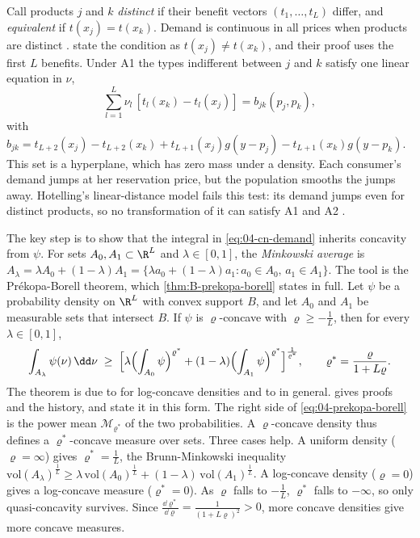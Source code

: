 Call products $j$ and $k$ \emph{distinct} if their benefit vectors $(t_1, \dots, t_L)$ differ, and
\emph{equivalent} if $t(x_j) = t(x_k)$. Demand is continuous in all prices when products are distinct
\citep[Proposition 1]{CaplinNalebuff1991}.
\citeauthor{CaplinNalebuff1991} state the condition as $t(x_j) \neq t(x_k)$, and their proof uses the first $L$
benefits. Under A1 the types indifferent between $j$ and $k$ satisfy one linear equation in $\nu$,
\[
  \sum_{l=1}^L \nu_l\,[t_l(x_k) - t_l(x_j)] = b_{jk}(p_j, p_k),
\]
with $b_{jk} = t_{L+2}(x_j) - t_{L+2}(x_k) + t_{L+1}(x_j)g(y - p_j) - t_{L+1}(x_k)g(y - p_k)$. This set is a
hyperplane, which has zero mass under a density. Each consumer's demand jumps at her reservation price, but the
population smooths the jumps away. Hotelling's linear-distance model fails this test: its demand jumps even for
distinct products, so no transformation of it can satisfy A1 and A2 \citep[p.~9]{CaplinNalebuff1991}.

The key step is to show that the integral in \eqref{eq:04-cn-demand} inherits concavity from $\psi$. For sets
$A_0, A_1 \subset \R^L$ and $\lambda \in [0,1]$, the \emph{Minkowski average} is
$A_\lambda = \lambda A_0 + (1 - \lambda)A_1 = \{\lambda a_0 + (1 - \lambda)a_1 : a_0 \in A_0,\, a_1 \in A_1\}$.
The tool is the Pr\'ekopa-Borell theorem, which \cref{thm:B-prekopa-borell} states in full. Let $\psi$ be a
probability density on $\R^L$ with convex support $B$, and let $A_0$ and $A_1$ be measurable sets that intersect
$B$. If $\psi$ is $\varrho$-concave with $\varrho \ge -\frac{1}{L}$, then for every $\lambda \in [0,1]$,
\begin{equation}\label{eq:04-prekopa-borell}
  \int_{A_\lambda}\psi(\nu)\,\dd\nu \;\ge\;
  \Bigl[\lambda\Bigl(\int_{A_0}\psi\Bigr)^{\varrho^*} + (1 - \lambda)\Bigl(\int_{A_1}\psi\Bigr)^{\varrho^*}\Bigr]^{\frac{1}{\varrho^*}},
  \qquad \varrho^* = \frac{\varrho}{1 + L\varrho}.
\end{equation}
The theorem is due to \citet{Prekopa1971} for log-concave densities and to \citet{Borell1975} in general.
\citet{DasGupta1980} gives proofs and the history, and \citet[p.~11]{CaplinNalebuff1991} state it in this form.
The right side of \eqref{eq:04-prekopa-borell} is the power mean $\mathcal{M}_{\varrho^*}$ of the two
probabilities. A $\varrho$-concave density thus defines a $\varrho^*$-concave measure over sets. Three cases help.
A uniform density ($\varrho = \infty$) gives $\varrho^* = \frac{1}{L}$, the Brunn-Minkowski inequality
$\mathrm{vol}(A_\lambda)^{\frac{1}{L}} \ge \lambda\,\mathrm{vol}(A_0)^{\frac{1}{L}} + (1 - \lambda)\,\mathrm{vol}(A_1)^{\frac{1}{L}}$.
A log-concave density ($\varrho = 0$) gives a log-concave measure ($\varrho^* = 0$). As $\varrho$ falls to $-\frac{1}{L}$, $\varrho^*$
falls to $-\infty$, so only quasi-concavity survives. Since $\frac{\dd \varrho^*}{\dd \varrho} = \frac{1}{(1 + L\varrho)^2} > 0$,
more concave densities give more concave measures.

